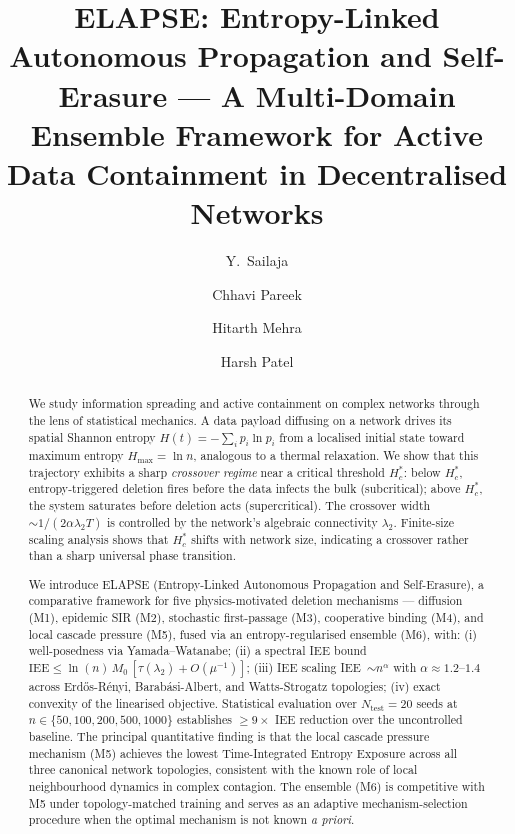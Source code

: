 \documentclass[review,12pt]{elsarticle}
\newcommand{\IEE}{\mathrm{IEE}}
\newcommand{\Hc}{H_c}
\newcommand{\Hmax}{H_{\max}}
\begin{document}
\begin{frontmatter}

\title{ELAPSE: Entropy-Linked Autonomous Propagation and Self-Erasure ---
       A Multi-Domain Ensemble Framework for Active Data Containment
       in Decentralised Networks}

\author[rv]{Y.~Sailaja}

\author[rv]{Chhavi Pareek}
\author[rv]{Hitarth Mehra}
\author[rv]{Harsh Patel}

\address[rv]{Department of Mathematics / Department of Computer Science \&
             Engineering, RV College of Engineering, Bangalore 560059, India}

\begin{abstract}
We study information spreading and active containment on complex networks
through the lens of statistical mechanics.  A data payload diffusing on a
network drives its spatial Shannon entropy $H(t) = -\sum_i p_i \ln p_i$
from a localised initial state toward maximum entropy $\Hmax = \ln n$,
analogous to a thermal relaxation.  We show that this trajectory exhibits a sharp \emph{crossover regime}
near a critical threshold $\Hc^*$:
below $\Hc^*$, entropy-triggered deletion fires before the data infects the
bulk (subcritical); above $\Hc^*$, the system saturates before deletion acts
(supercritical).  The crossover width $\sim 1/(2\alpha\lambda_2 T)$ is
controlled by the network's algebraic connectivity $\lambda_2$.
Finite-size scaling analysis shows that $\Hc^*$ shifts with network size,
indicating a crossover rather than a sharp universal phase transition.

We introduce ELAPSE (Entropy-Linked Autonomous Propagation and Self-Erasure),
a comparative framework for five physics-motivated deletion mechanisms ---
diffusion (M1), epidemic SIR (M2), stochastic first-passage (M3), cooperative
binding (M4), and local cascade pressure (M5), fused via an
entropy-regularised ensemble (M6), with: (i) well-posedness via
Yamada--Watanabe; (ii) a spectral IEE bound
$\IEE \leq \ln(n)\,M_0\,[\tau(\lambda_2) + O(\mu^{-1})]$;
(iii) IEE scaling IEE~$\sim n^\alpha$ with $\alpha \approx 1.2$--$1.4$
across Erd\H{o}s-R\'enyi, Barab\'asi-Albert, and Watts-Strogatz topologies;
(iv) exact convexity of the linearised objective.
Statistical evaluation over $N_{\mathrm{test}}=20$ seeds at $n \in \{50,
100, 200, 500, 1000\}$ establishes $\geq 9\times$ IEE reduction over the
uncontrolled baseline.  The principal quantitative finding is that the
local cascade pressure mechanism (M5) achieves the lowest Time-Integrated
Entropy Exposure across all three canonical network topologies, consistent
with the known role of local neighbourhood dynamics in complex contagion.
The ensemble (M6) is competitive with M5 under topology-matched training
and serves as an adaptive mechanism-selection procedure when the optimal
mechanism is not known \emph{a priori}.
\end{abstract}


\end{frontmatter}
\end{document}

